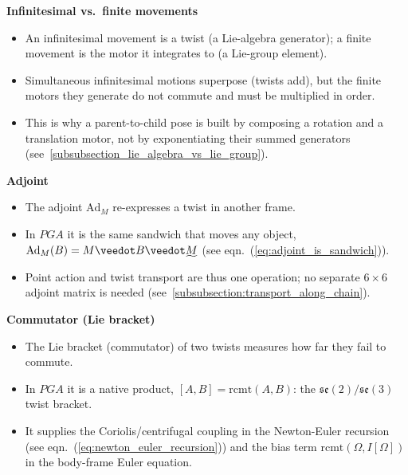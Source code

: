 \textbf{Infinitesimal vs.\ finite movements}
\begin{itemize}
    \item An infinitesimal movement is a twist (a Lie-algebra generator); a finite
    movement is the motor it integrates to (a Lie-group element).

    \item Simultaneous infinitesimal motions superpose (twists add), but the finite motors
    they generate do not commute and must be multiplied in order.

    \item This is why a parent-to-child pose is built by composing a rotation and a
    translation motor, not by exponentiating their summed generators
    (see~\ref{subsubsection_lie_algebra_vs_lie_group}).
\end{itemize}

\textbf{Adjoint}
\begin{itemize}
    \item The adjoint $\mathrm{Ad}_M$ re-expresses a twist in another frame.

    \item In $PGA$ it is the same sandwich that moves any object, $\mathrm{Ad}_M(B) = M
    \veedot B \veedot \rrev{M}$ (see eqn.~(\ref{eq:adjoint_is_sandwich})).

    \item Point action and twist transport are thus one operation; no separate $6\times6$
    adjoint matrix is needed (see~\ref{subsubsection:transport_along_chain}).
\end{itemize}

\textbf{Commutator (Lie bracket)}
\begin{itemize}
    \item The Lie bracket (commutator) of two twists measures how far they fail to
    commute.

    \item In $PGA$ it is a native product, $[A, B] = \mathrm{rcmt}(A, B)$: the
    $\mathfrak{se}(2)/\mathfrak{se}(3)$ twist bracket.

    \item It supplies the Coriolis/centrifugal coupling in the Newton-Euler recursion (see
    eqn.~(\ref{eq:newton_euler_recursion})) and the bias term $\mathrm{rcmt}(\Omega,
    I[\Omega])$ in the body-frame Euler equation.
\end{itemize}

